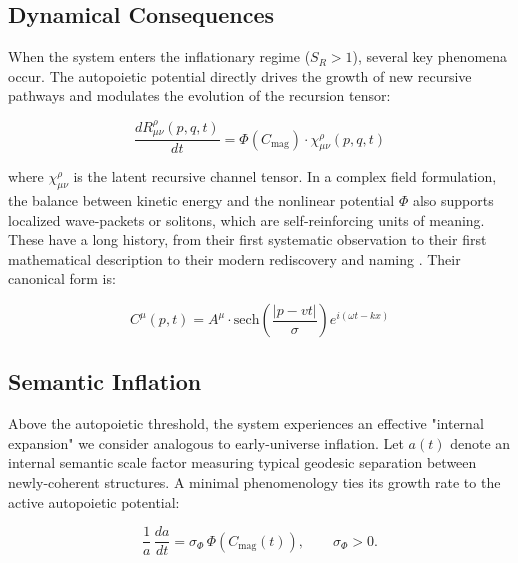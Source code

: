 \subsection{Dynamical Consequences}
\label{7.3.1:dynamical_consequences}

When the system enters the inflationary regime (\(S_R > 1\)), several key phenomena occur. The autopoietic potential directly drives the growth of new recursive pathways and modulates the evolution of the recursion tensor:

\begin{equation}
\frac{dR^\rho_{\mu\nu}(p,q,t)}{dt} = \Phi(C_{\mathrm{mag}}) \cdot \chi^\rho_{\mu\nu}(p,q,t)
\end{equation}

where \(\chi^\rho_{\mu\nu}\) is the latent recursive channel tensor. In a complex field formulation, the balance between kinetic energy and the nonlinear potential \(\Phi\) also supports localized wave-packets or solitons, which are self-reinforcing units of meaning. These have a long history, from their first systematic observation \autocite{Russell1845} to their first mathematical description \autocite{KortewegdeVries1895} to their modern rediscovery and naming \autocite{ZabuskyKruskal1965}. Their canonical form is:

\begin{equation}
C^\mu(p,t) = A^\mu \cdot \text{sech}\left(\frac{|p-vt|}{\sigma}\right) e^{i(\omega t - kx)}
\end{equation}


\subsection{Semantic Inflation}
\label{7.3.2:semantic_inflation}

Above the autopoietic threshold, the system experiences an effective "internal expansion" we consider analogous to early-universe inflation. Let \(a(t)\) denote an internal semantic scale factor measuring typical geodesic separation between newly-coherent structures. A minimal phenomenology ties its growth rate to the active autopoietic potential:

\begin{equation}
\frac{1}{a}\,\frac{da}{dt} = \sigma_\Phi\, \Phi(C_{\mathrm{mag}}(t)), \qquad \sigma_\Phi>0.
\end{equation}

